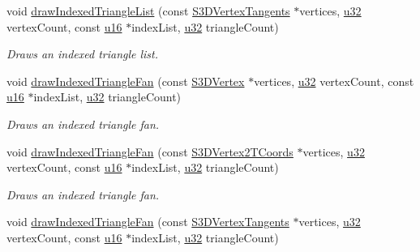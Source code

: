 \begin{DoxyCompactItemize}
void \hyperlink{classirr_1_1video_1_1IVideoDriver_a09777bd8ca7a25e6f6134369e5dfb680}{draw\+Indexed\+Triangle\+List} (const \hyperlink{structirr_1_1video_1_1S3DVertexTangents}{S3\+D\+Vertex\+Tangents} $\ast$vertices, \hyperlink{namespaceirr_a0416a53257075833e7002efd0a18e804}{u32} vertex\+Count, const \hyperlink{namespaceirr_ae9f8ec82692ad3b83c21f555bfa70bcc}{u16} $\ast$index\+List, \hyperlink{namespaceirr_a0416a53257075833e7002efd0a18e804}{u32} triangle\+Count)
\begin{DoxyCompactList}\small\item\em Draws an indexed triangle list. \end{DoxyCompactList}\item 
void \hyperlink{classirr_1_1video_1_1IVideoDriver_a8303b9a0f3e941d07d8cdc70c8fc1346}{draw\+Indexed\+Triangle\+Fan} (const \hyperlink{structirr_1_1video_1_1S3DVertex}{S3\+D\+Vertex} $\ast$vertices, \hyperlink{namespaceirr_a0416a53257075833e7002efd0a18e804}{u32} vertex\+Count, const \hyperlink{namespaceirr_ae9f8ec82692ad3b83c21f555bfa70bcc}{u16} $\ast$index\+List, \hyperlink{namespaceirr_a0416a53257075833e7002efd0a18e804}{u32} triangle\+Count)
\begin{DoxyCompactList}\small\item\em Draws an indexed triangle fan. \end{DoxyCompactList}\item 
void \hyperlink{classirr_1_1video_1_1IVideoDriver_ae0b8902326a78075ad1b12d0cfc722aa}{draw\+Indexed\+Triangle\+Fan} (const \hyperlink{structirr_1_1video_1_1S3DVertex2TCoords}{S3\+D\+Vertex2\+T\+Coords} $\ast$vertices, \hyperlink{namespaceirr_a0416a53257075833e7002efd0a18e804}{u32} vertex\+Count, const \hyperlink{namespaceirr_ae9f8ec82692ad3b83c21f555bfa70bcc}{u16} $\ast$index\+List, \hyperlink{namespaceirr_a0416a53257075833e7002efd0a18e804}{u32} triangle\+Count)
\begin{DoxyCompactList}\small\item\em Draws an indexed triangle fan. \end{DoxyCompactList}\item 
void \hyperlink{classirr_1_1video_1_1IVideoDriver_a7fbc69e35e987b4d3882e51a62b8030b}{draw\+Indexed\+Triangle\+Fan} (const \hyperlink{structirr_1_1video_1_1S3DVertexTangents}{S3\+D\+Vertex\+Tangents} $\ast$vertices, \hyperlink{namespaceirr_a0416a53257075833e7002efd0a18e804}{u32} vertex\+Count, const \hyperlink{namespaceirr_ae9f8ec82692ad3b83c21f555bfa70bcc}{u16} $\ast$index\+List, \hyperlink{namespaceirr_a0416a53257075833e7002efd0a18e804}{u32} triangle\+Count)

\end{DoxyCompactItemize}
